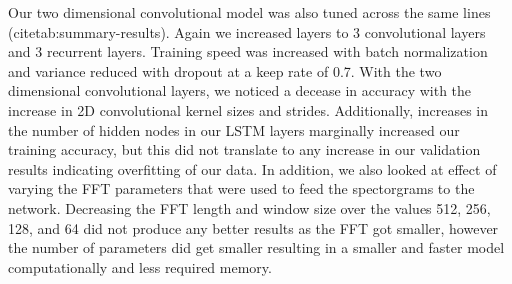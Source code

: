 \documentclass{article}
\begin{document}
Our two dimensional convolutional model was also tuned across the same
lines (cite{tab:summary-results}). Again we increased layers to 3
convolutional layers and 3 recurrent layers. Training speed was
increased with batch normalization and variance reduced with dropout
at a keep rate of 0.7. With the two dimensional convolutional layers,
we noticed a decease in accuracy with the increase in 2D convolutional
kernel sizes and strides. Additionally, increases in the number of
hidden nodes in our LSTM layers marginally increased our training
accuracy, but this did not translate to any increase in our validation
results indicating overfitting of our data. In addition, we also
looked at effect of varying the FFT parameters that were used to feed
the spectorgrams to the network. Decreasing the FFT length and window
size over the values 512, 256, 128, and 64 did not produce any better
results as the FFT got smaller, however the number of parameters did
get smaller resulting in a smaller and faster model
computationally and less required memory.
\end{document}
